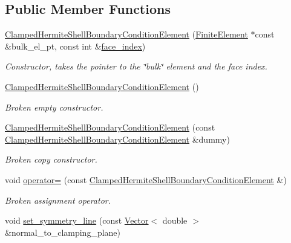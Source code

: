\subsection*{Public Member Functions}
\begin{DoxyCompactItemize}
\item 
\hyperlink{classoomph_1_1ClampedHermiteShellBoundaryConditionElement_ac2c060fc25233cb0c73fdff218c25922}{Clamped\+Hermite\+Shell\+Boundary\+Condition\+Element} (\hyperlink{classoomph_1_1FiniteElement}{Finite\+Element} $\ast$const \&bulk\+\_\+el\+\_\+pt, const int \&\hyperlink{classoomph_1_1FaceElement_a478d577ac6db67ecc80f1f02ae3ab170}{face\+\_\+index})
\begin{DoxyCompactList}\small\item\em Constructor, takes the pointer to the \char`\"{}bulk\char`\"{} element and the face index. \end{DoxyCompactList}\item 
\hyperlink{classoomph_1_1ClampedHermiteShellBoundaryConditionElement_a72fed47743a1a079d39307c63d06a65b}{Clamped\+Hermite\+Shell\+Boundary\+Condition\+Element} ()
\begin{DoxyCompactList}\small\item\em Broken empty constructor. \end{DoxyCompactList}\item 
\hyperlink{classoomph_1_1ClampedHermiteShellBoundaryConditionElement_a82fb81f4cd6214474c8966d8f3bd7d58}{Clamped\+Hermite\+Shell\+Boundary\+Condition\+Element} (const \hyperlink{classoomph_1_1ClampedHermiteShellBoundaryConditionElement}{Clamped\+Hermite\+Shell\+Boundary\+Condition\+Element} \&dummy)
\begin{DoxyCompactList}\small\item\em Broken copy constructor. \end{DoxyCompactList}\item 
void \hyperlink{classoomph_1_1ClampedHermiteShellBoundaryConditionElement_af5081c0ce57fedef78e6dc2359ea3a1d}{operator=} (const \hyperlink{classoomph_1_1ClampedHermiteShellBoundaryConditionElement}{Clamped\+Hermite\+Shell\+Boundary\+Condition\+Element} \&)
\begin{DoxyCompactList}\small\item\em Broken assignment operator. \end{DoxyCompactList}\item 
void \hyperlink{classoomph_1_1ClampedHermiteShellBoundaryConditionElement_a965c9a87e809f21f77ea4eb635fdd996}{set\+\_\+symmetry\+\_\+line} (const \hyperlink{classoomph_1_1Vector}{Vector}$<$ double $>$ \&normal\+\_\+to\+\_\+clamping\+\_\+plane)

\end{DoxyCompactItemize}
